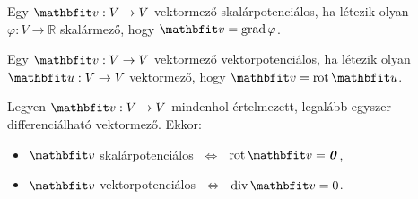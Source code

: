 \documentclass[lang=magyar]{math-handout}
\begin{document}
\begin{definition}[Skalárpotenciálosság]
  Egy $\rvec v: V \rightarrow V$ vektormező skalárpotenciálos, ha létezik olyan
  $\varphi: V \rightarrow \mathbb R$ skalármező, hogy $\rvec v = \grad \varphi$.
\end{definition}

\begin{definition}[Vektorpotenciálosság]
  Egy $\rvec v: V \rightarrow V$ vektormező vektorpotenciálos, ha létezik olyan
  $\rvec u: V \rightarrow V$ vektormező, hogy $\rvec v = \rot \rvec u$.
\end{definition}

\begin{theorem}
  Legyen $\rvec v: V \rightarrow V$ mindenhol értelmezett, legalább egyszer
  differenciálható vektormező. Ekkor:
  \begin{itemize}
    \item $\rvec v$ skalárpotenciálos
          $\;\Leftrightarrow\;$
          $\rot \rvec v = \nvec$,
    \item $\rvec v$ vektorpotenciálos
          $\;\Leftrightarrow\;$
          $\Div \rvec v = 0$.
  \end{itemize}
\end{theorem}
\end{document}
